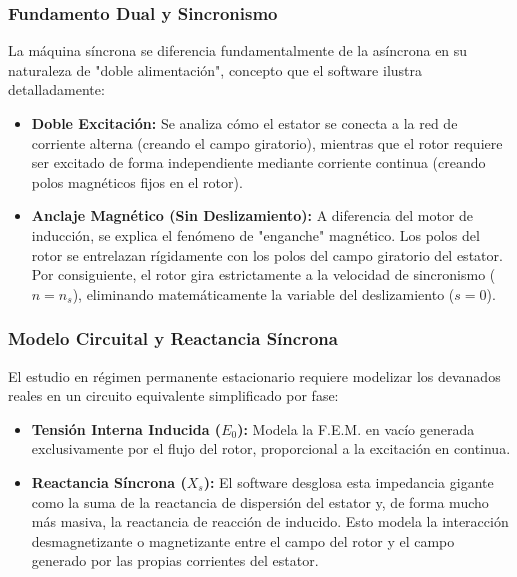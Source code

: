 \documentclass[11pt,a4paper]{article}
\begin{document}
\subsubsection{Fundamento Dual y Sincronismo}
La máquina síncrona se diferencia fundamentalmente de la asíncrona en su naturaleza de "doble alimentación", concepto que el software ilustra detalladamente:
\begin{itemize}
    \item \textbf{Doble Excitación:} Se analiza cómo el estator se conecta a la red de corriente alterna (creando el campo giratorio), mientras que el rotor requiere ser excitado de forma independiente mediante corriente continua (creando polos magnéticos fijos en el rotor).
    \item \textbf{Anclaje Magnético (Sin Deslizamiento):} A diferencia del motor de inducción, se explica el fenómeno de "enganche" magnético. Los polos del rotor se entrelazan rígidamente con los polos del campo giratorio del estator. Por consiguiente, el rotor gira estrictamente a la velocidad de sincronismo ($n = n_s$), eliminando matemáticamente la variable del deslizamiento ($s = 0$).
\end{itemize}

\subsubsection{Modelo Circuital y Reactancia Síncrona}
El estudio en régimen permanente estacionario requiere modelizar los devanados reales en un circuito equivalente simplificado por fase:
\begin{itemize}
    \item \textbf{Tensión Interna Inducida ($E_0$):} Modela la F.E.M. en vacío generada exclusivamente por el flujo del rotor, proporcional a la excitación en continua.
    \item \textbf{Reactancia Síncrona ($X_s$):} El software desglosa esta impedancia gigante como la suma de la reactancia de dispersión del estator y, de forma mucho más masiva, la reactancia de reacción de inducido. Esto modela la interacción desmagnetizante o magnetizante entre el campo del rotor y el campo generado por las propias corrientes del estator.
\end{itemize}
\end{document}
